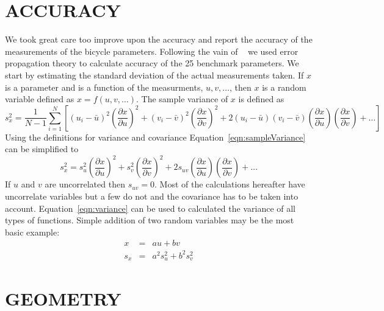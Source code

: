\documentclass{bmd2010p}
\begin{document}
\section{ACCURACY}
We took great care too improve upon the accuracy and report the accuracy of the
measurements of the bicycle parameters. Following the vain of
~\cite{Roland1971} we used error propagation theory to calculate accuracy of
the 25 benchmark parameters. We start by estimating the standard deviation of
the actual measurements taken. If $x$ is a parameter and is a function of
the measurments, $u,v,\ldots$, then $x$ is a random variable defined as
$x=f(u,v,\ldots)$. The sample variance of $x$ is defined as
\begin{equation}
    s_x^2 =
    \frac{1}{N-1}\sum^N_{i=1}
    \left[(u_i - \bar{u})^2\left(\frac{\partial x}{\partial u}\right)^2 +
    (v_i - \bar{v})^2\left(\frac{\partial x}{\partial v}\right)^2 +
    2(u_i - \bar{u})(v_i - \bar{v})\left(\frac{\partial x}{\partial u}\right)\left(\frac{\partial x}{\partial v}\right)
    + \ldots\right]
    \label{eqn:sampleVariance}
\end{equation}
Using the definitions for variance and covariance
Equation~\ref{eqn:sampleVariance} can be simplified to
\begin{equation}
    s_x^2 = s_u^2\left(\frac{\partial x}{\partial u}\right)^2 +
            s_v^2\left(\frac{\partial x}{\partial v}\right)^2 +
            2s_{uv}\left(\frac{\partial x}{\partial u}\right)\left(\frac{\partial x}{\partial v}\right)
            + \ldots
    \label{eqn:variance}
\end{equation}
If $u$ and $v$ are uncorrelated then $s_{uv}=0$. Most of the calculations
hereafter have uncorrelate variables but a few do not and the covariance has to
be taken into account. Equation~\ref{eqn:variance} can be
used to calculated the variance of all types of functions. Simple addition of
two random variables may be the most basic example:
\begin{eqnarray}
    \label{eqn:addition}
    x &=&  au + bv\\
    s_x &=& a^2s_u^2 + b^2s_v^2
\end{eqnarray}
\section{GEOMETRY}
\end{document}
